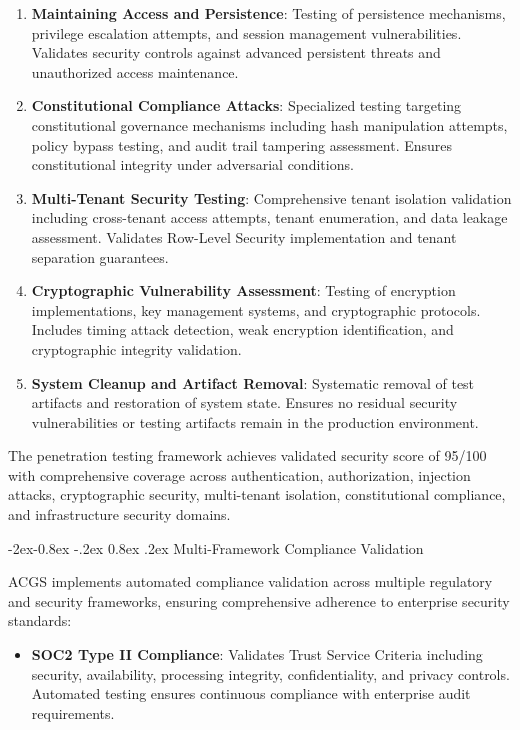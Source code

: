 \documentclass[manuscript,screen,9pt]{acmart}
\makeatletter
\renewcommand\subsubsection{\@startsection{subsubsection}{3}{\z@}%
  {-2ex\@plus -0.8ex \@minus -.2ex}%
  {0.8ex \@plus .2ex}%
  {\normalfont\normalsize\bfseries}}
\makeatother
\begin{document}
\begin{table}[!htb]
\begin{enumerate}[leftmargin=*,itemsep=2pt,parsep=1pt]
    \item \textbf{Maintaining Access and Persistence}: Testing of persistence mechanisms, privilege escalation attempts, and session management vulnerabilities. Validates security controls against advanced persistent threats and unauthorized access maintenance.

    \item \textbf{Constitutional Compliance Attacks}: Specialized testing targeting constitutional governance mechanisms including hash manipulation attempts, policy bypass testing, and audit trail tampering assessment. Ensures constitutional integrity under adversarial conditions.

    \item \textbf{Multi-Tenant Security Testing}: Comprehensive tenant isolation validation including cross-tenant access attempts, tenant enumeration, and data leakage assessment. Validates Row-Level Security implementation and tenant separation guarantees.

    \item \textbf{Cryptographic Vulnerability Assessment}: Testing of encryption implementations, key management systems, and cryptographic protocols. Includes timing attack detection, weak encryption identification, and cryptographic integrity validation.

    \item \textbf{System Cleanup and Artifact Removal}: Systematic removal of test artifacts and restoration of system state. Ensures no residual security vulnerabilities or testing artifacts remain in the production environment.
\end{enumerate}

The penetration testing framework achieves validated security score of 95/100 with comprehensive coverage across authentication, authorization, injection attacks, cryptographic security, multi-tenant isolation, constitutional compliance, and infrastructure security domains.

\subsubsection{Multi-Framework Compliance Validation}
\label{subsubsec:compliance_validation}

ACGS implements automated compliance validation across multiple regulatory and security frameworks, ensuring comprehensive adherence to enterprise security standards:

\begin{itemize}[leftmargin=*,itemsep=2pt,parsep=1pt]
    \item \textbf{SOC2 Type II Compliance}: Validates Trust Service Criteria including security, availability, processing integrity, confidentiality, and privacy controls. Automated testing ensures continuous compliance with enterprise audit requirements.


\end{itemize}
\end{table}
\end{document}
